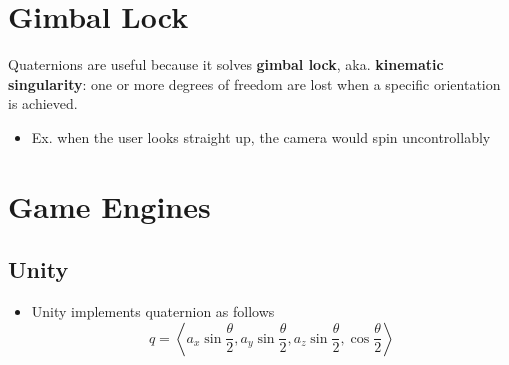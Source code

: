 \section{Gimbal Lock}

  Quaternions are useful because it solves \textbf{gimbal lock}, aka.
  \textbf{kinematic singularity}: one or more degrees of freedom are lost when
  a specific orientation is achieved.

  \begin{itemize}
    \item Ex. when the user looks straight up, the camera would spin
    uncontrollably
  \end{itemize}


\section{Game Engines}

  \subsection{Unity}

    \begin{itemize}
      \item Unity implements quaternion as follows
      \begin{equation}
        q =
        \left<
          a_{x} \sin\frac{\theta}{2},
          a_{y} \sin\frac{\theta}{2},
          a_{z} \sin\frac{\theta}{2},
          \cos\frac{\theta}{2}
        \right>
      \end{equation}
    \end{itemize}
